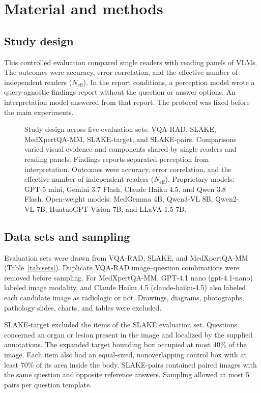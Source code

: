 \section{Material and methods}

\subsection{Study design}
This controlled evaluation compared single readers with reading panels of VLMs.
The outcomes were accuracy, error correlation, and the effective number of independent readers ($N_{\mathrm{eff}}$).
In the report conditions, a perception model wrote a query-agnostic findings report without the question or answer options.\cite{qiao2024prism}
An interpretation model answered from that report.
The protocol was fixed before the main experiments.

\begin{figure}[!tbp]
\centering
{}
\caption{Study design across five evaluation sets: VQA-RAD, SLAKE, MedXpertQA-MM, SLAKE-target, and SLAKE-pairs. Comparisons varied visual evidence and components shared by single readers and reading panels. Findings reports separated perception from interpretation. Outcomes were accuracy, error correlation, and the effective number of independent readers ($N_{\mathrm{eff}}$). Proprietary models: GPT-5 mini, Gemini 3.7 Flash, Claude Haiku 4.5, and Qwen 3.8 Flash. Open-weight models: MedGemma 4B, Qwen3-VL 8B, Qwen2-VL 7B, HuatuoGPT-Vision 7B, and LLaVA-1.5 7B.}
\label{fig:design}
\end{figure}

\subsection{Data sets and sampling}
Evaluation sets were drawn from VQA-RAD, SLAKE, and MedXpertQA-MM (Table~\ref{tab:sets}).\cite{lau2018vqarad,liu2021slake,zuo2025medxpertqa}
Duplicate VQA-RAD image--question combinations were removed before sampling.
For MedXpertQA-MM, GPT-4.1 nano (gpt-4.1-nano) labeled image modality, and Claude Haiku 4.5 (claude-haiku-4.5) also labeled each candidate image as radiologic or not.
Drawings, diagrams, photographs, pathology slides, charts, and tables were excluded.

SLAKE-target excluded the items of the SLAKE evaluation set.
Questions concerned an organ or lesion present in the image and localized by the supplied annotations.
The expanded target bounding box occupied at most 40\% of the image.
Each item also had an equal-sized, nonoverlapping control box with at least 70\% of its area inside the body.
SLAKE-pairs contained paired images with the same question and opposite reference answers.
Sampling allowed at most 5 pairs per question template.

